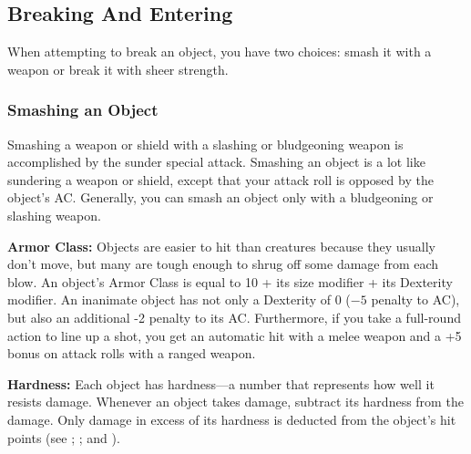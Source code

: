 \subsection{Breaking And Entering}
When attempting to break an object, you have two choices: smash it with a weapon or break it with sheer strength.

\subsubsection{Smashing an Object}
Smashing a weapon or shield with a slashing or bludgeoning weapon is accomplished by the sunder special attack. Smashing an object is a lot like sundering a weapon or shield, except that your attack roll is opposed by the object's AC. Generally, you can smash an object only with a bludgeoning or slashing weapon.

\textbf{Armor Class:} Objects are easier to hit than creatures because they usually don't move, but many are tough enough to shrug off some damage from each blow. An object's Armor Class is equal to 10 + its size modifier + its Dexterity modifier. An inanimate object has not only a Dexterity of 0 ($-5$ penalty to AC), but also an additional -2 penalty to its AC. Furthermore, if you take a full-round action to line up a shot, you get an automatic hit with a melee weapon and a +5 bonus on attack rolls with a ranged weapon.

\textbf{Hardness:} Each object has hardness---a number that represents how well it resists damage. Whenever an object takes damage, subtract its hardness from the damage. Only damage in excess of its hardness is deducted from the object's hit points (see ; ; and ).

